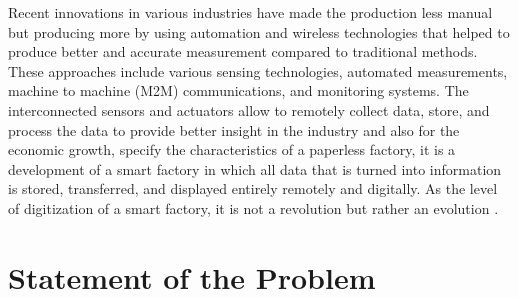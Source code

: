 Recent innovations in various industries have made the production less manual but producing more by using automation and wireless technologies that helped to produce better and accurate measurement compared to traditional methods. These approaches include various sensing technologies, automated measurements, machine to machine (M2M) communications, and monitoring systems. The interconnected sensors and actuators allow to remotely collect data, store, and process the data to provide better insight in the industry and also for the economic growth, specify the characteristics of a paperless factory, it is a development of a smart factory in which all data that is turned into information is stored, transferred, and displayed entirely remotely and digitally. As the level of digitization of a smart factory, it is not a revolution but rather an evolution \citep{bulut2020}.


\section{Statement of the Problem}
\label{intro:sec:Statement of the Problem}

